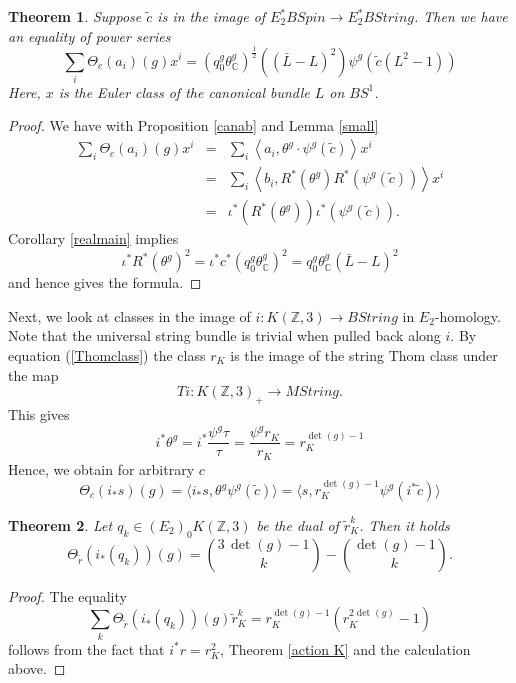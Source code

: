 \documentclass{amsart}
\newcommand {\Z}{{\mathbb Z}}
\newcommand {\C}{{\mathbb C}}
\newcommand{\lra}{\longrightarrow}              %
\numberwithin{equation}{section}
\newtheorem{thm}{Theorem}[section]
\theoremstyle{definition}  %
\newtheorem{set theory}[thm]{Set Theoretic Prelude}
\begin{document}
\begin{thm} Suppose $\tilde{c}$ is in the image of $E_2^*BSpin\to E_2^*BString$.
Then we have an equality of power series
$$\sum_i  \Theta_c(a_i)(g ) x^i = (q_0^g\theta_\C^g)^{\frac{1}{2}}((\bar{L}-L)^2) \psi^g(\tilde{c}(L^2-1))$$ 
Here, $x$ is the Euler class of the canonical bundle $L$ on $BS^1 $.
\end{thm}
\begin{proof}
We have with Proposition \ref{canab} and Lemma \ref{small}
\begin{eqnarray*}
\sum_i  \Theta_c(a_i)(g ) x^i & =& \sum_i \left< a_i, \theta^g\cdot  \psi^g (\tilde{c})\right>x^i
 \\
 &=& \sum_i  \left< b_i,  R^*(\theta^g)  R^*( \psi^g (\tilde{c})) \right> x^i\\
 &=&  \iota^* (R^*(\theta^g))\iota^*(  \psi^g (\tilde{c}) ).
 \end{eqnarray*}
Corollary \ref{realmain} implies
$$ \iota^*R^*(\theta^g)^2 = \iota^* c^*(q_0^g\theta^g_\C)^2 =q_0^g\theta^g_\C(\bar{L}-L)^2$$
and hence gives the formula.
\end{proof}
\bigskip

Next, we look at classes in the image of $i: K(\Z,3)\to BString$ in $E_2$-homology. Note that the universal string bundle is trivial when pulled back along $i$.  By equation (\ref{Thomclass}) the class $r_K$ is the image of the string Thom class under the map
$$ Ti: K(\Z,3)_+ \lra MString.$$   This gives
$$i^*\theta^g=i^*\frac{\psi^g \tau}{\tau}=\frac{\psi^g r_K}{r_K}={r}_K^{\det (g )-1}$$
Hence, we obtain for arbitrary $c$ 
$$
\Theta_c(i_*s)(g)= \langle i_*s, \theta^g \psi^g(\tilde{c})\rangle = 
\langle s, {r}_K^{\det (g )-1}\psi^{g}(i^*\tilde{c})\rangle 
$$
\begin{thm}
 Let $q_k \in (E_2)_{0}K(\Z,3)$ be the dual of $\tilde{r}_K^k$. Then it holds
 $$ \Theta_{\tilde{r}}(i_*(q_k))(g)=\binom{3\, \det(g)-1}{k}-\binom{\det(g)-1}{k}.
$$

\end{thm}
\begin{proof} The equality 
$$ \sum_k \Theta_{\tilde{r}}(i_*(q_k))(g)\tilde{r}_K^k=
{r}_K^{\det(g)-1}({r}_K^{2\det(g)}-1)
$$
follows from the fact that $i^*r=r_K^2$, Theorem \ref{action K} and the calculation above.


\end{proof}




\end{document}
